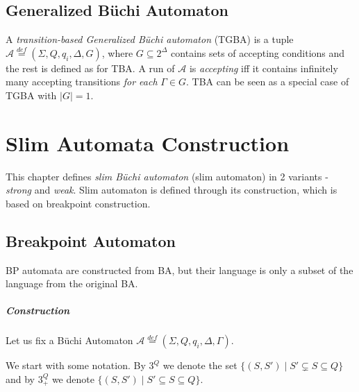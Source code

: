 \documentclass[
	digital,
nolof, nolot
]{fithesis3}
\newcommand{\cA}{\mathcal{A}}
\newcommand{\cD}{\mathcal{D}}
\newcommand{\lA}{L(\cA)}
\newcommand{\lD}{L(\cD)}
\newcommand{\eqdef}{\overset{def}{=}}
\begin{document}
			
		\section{Generalized Büchi Automaton}
		A \emph{transition-based Generalized Büchi automaton} (TGBA) is a tuple $\cA\eqdef(\Sigma, Q, q_i, \Delta, G)$, where $G \subseteq 2^\Delta$ contains sets of accepting conditions and the rest is defined as for TBA. A run of $\cA$ is \emph{accepting} iff it contains infinitely many accepting transitions \emph{for each} $\Gamma \in G$. TBA can be seen as a special case of TGBA with $|G|=1$.
		
		
			
			
			
	\chapter{Slim Automata Construction}
			
		
			
			
			
			
			
			
			
			This chapter defines \emph{slim Büchi automaton} (slim automaton) in 2 variants - \emph{strong} and \emph{weak}. Slim automaton is defined through its construction, which is based on breakpoint construction. 
			
			\section{Breakpoint Automaton} \label{section:bp}
			
			 BP automata are constructed from BA, but their language is only a subset of the language from the original BA. 
			
			\paragraph{Construction}
			Let us fix a Büchi Automaton $\cA\eqdef(\Sigma, Q, q_i, \Delta, \Gamma)$. 
			
			We start with some notation. By $3^Q$ we denote the set $\{(S,S') \mid S'\subsetneq S \subseteq Q\}$ and
			by $3^Q_+$ we denote $\{(S,S') \mid S'\subseteq S \subseteq Q\}$.
			
			
\end{document}
